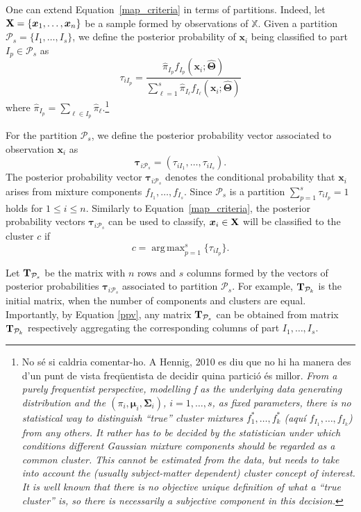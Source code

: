 \documentclass[submit]{smj}
\DeclareMathOperator*{\argmax}{arg\,max}
\theoremstyle{definition}
\newcommand{\m}[1]{\boldsymbol{#1}}
\newcommand{\X}{\text{\textbf{X}}}
\begin{document}
One can extend Equation~\ref{map_criteria} in terms of partitions. Indeed, let $\X = \{\m x_1,\dots, \m x_n\}$ be a sample formed by observations of $\mathbb{X}$. Given a partition $\mathcal{P}_s = \{ I_1, \dots, I_s \}$, we define the posterior probability of $\m x_i$ being classified to part $I_p\in \mathcal{P}_{s}$ as
\[
\tau_{i I_p} =  \frac{ \hat{\pi}_{I_p} f_{I_p}(\m x_i; \hat{\m\Theta}) }{\sum_{\ell=1}^s \hat{\pi}_{I_\ell} f_{I_\ell}(\m x_i; \hat{\m\Theta})}
\]
where $\hat{\pi}_{I_p} = \sum_{\ell \in I_p} \hat{\pi}_\ell$.\footnote{No sé si caldria comentar-ho. A Hennig, 2010 es diu que no hi ha manera des d'un punt de vista freqüentista de decidir quina partició és millor. \emph{From a purely frequentist perspective, modelling f as the underlying data generating distribution and the $(\pi_i, \m \mu_i, \m\Sigma_i)$, $i = 1,\dots,s$, as fixed parameters, there is no statistical way to distinguish “true” cluster mixtures $f^*_1 ,\dots, f^*_k$ (aquí $f_{I_1} ,\dots, f_{I_k}$) from any others. It rather has to be decided by the statistician under which conditions different Gaussian mixture components should be regarded as a common cluster. This cannot be estimated from the data, but needs to take into account the (usually subject-matter dependent) cluster concept of interest. It is well known that there is no objective unique definition of what a “true cluster” is, so there is necessarily a subjective component in this decision.}}

For the partition  $\mathcal{P}_s$, we define the posterior probability vector associated to observation $\m x_i$ as
\begin{equation}\label{ppv}
\m\tau_{i \mathcal{P}_s} = \left(\tau_{i I_1} , \dots, \tau_{i I_s}  \right).
\end{equation}
The posterior probability vector $\m \tau_{i \mathcal{P}_s}$ denotes the conditional probability that $\m x_i$ arises from mixture components $f_{I_1}, \dots, f_{I_s}$. Since $\mathcal{P}_s$ is a partition $\sum_{p=1}^s \tau_{i I_p} = 1$ holds  for $1 \leq i \leq n$. Similarly to Equation~\ref{map_criteria}, the posterior probability vectors $\m\tau_{i \mathcal{P}_s}$ can be used to classify, $\m x_i \in \X$ will be classified to the cluster $c$ if
\begin{equation}\label{cluster_criteria}
c= \argmax_{p=1}^s \{ \tau_{i I_p} \}.
\end{equation}

Let $\text{\textbf{T}}_{\mathcal{P}_s}$ be the matrix with $n$ rows and $s$ columns formed by the vectors of posterior probabilities $\m \tau_{i\mathcal{P}_s}$ associated to partition $\mathcal{P}_s$. For example, $\text{\textbf{T}}_{\mathcal{P}_k}$ is the initial matrix, when the number of components and clusters are equal. Importantly, by Equation \ref{ppv}, any matrix $\text{\textbf{T}}_{\mathcal{P}_s}$ can be obtained from matrix $\text{\textbf{T}}_{\mathcal{P}_k}$ respectively aggregating the corresponding columns of part $I_1, \dots, I_s$.
\end{document}
